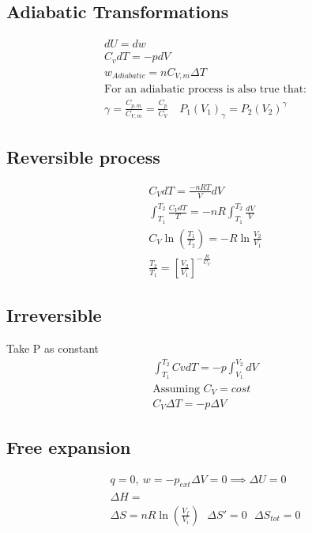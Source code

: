 \documentclass[a4paper]{report}
\begin{document}
\begin{multicols}{2}
      \section{Adiabatic Transformations}

          \begin{gather*}
            dU = dw \\
            C_{v}dT = -pdV \\
            w_{Adiabatic} = nC_{V,m}\Delta T\\
            \text{For an adiabatic process is also true that:} \\
              \gamma = \frac{C_{p,m} }{C_{V,m} } = \frac{C_{p}  }{C_{V} } \quad P_1(V_1)_{\gamma } = P_2(V_2 )^{\gamma }  
          \end{gather*}

        \subsection{Reversible process}
        \begin{gather*}
          C_{V}dT = \frac{-nRT}{V}dV\\
          \int _{T_1}^{T_2} \frac{C_{V}dT }{T}  = -nR\int _{T_1}^{T_2}\frac{dV}{V}\\
          C_{V}\ln \left(\frac{T_1}{T_2} \right) = -R\ln \frac{V_2}{V_1} \\
          \frac{T_2}{T_1}=\left [\frac{V_2}{V_1}\right]^{-\frac{R}{C_{V}}}
        \end{gather*}

        \subsection{Irreversible}
        Take P as constant
        \begin{gather*}
          \int _{T_1}^{T_2} CvdT = -p \int _{V_1}^{V_2}dV\\
          \text{Assuming } C_{V}= cost\\
          C_{V}\Delta T = -p \Delta V 
        \end{gather*}

        \subsection{Free expansion}

          \begin{gather*}
            q = 0, ~ w = -p_{ext} \Delta V = 0 \implies \Delta U = 0 \\
            \Delta H = \\
            \Delta S = nR\ln (\frac{V_f}{V_i}) ~ ~ ~ \Delta S' = 0 ~ ~ ~ \Delta S_{tot} = 0
          \end{gather*}

\end{multicols}
\end{document}
